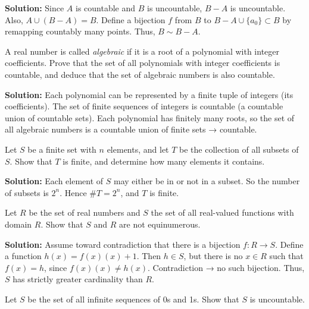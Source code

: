 \textbf{Solution:}  
Since \( A \) is countable and \( B \) is uncountable, \( B - A \) is uncountable.  
Also, \( A \cup (B - A) = B \). Define a bijection \( f \) from \( B \) to \( B - A \cup \{a_0\} \subset B \) by remapping countably many points.  
Thus, \( B \sim B - A \).

\begin{problembox}
A real number is called \emph{algebraic} if it is a root of a polynomial with integer coefficients.  
Prove that the set of all polynomials with integer coefficients is countable, and deduce that the set of algebraic numbers is also countable.
\end{problembox}

\textbf{Solution:}  
Each polynomial can be represented by a finite tuple of integers (its coefficients). The set of finite sequences of integers is countable (a countable union of countable sets).  
Each polynomial has finitely many roots, so the set of all algebraic numbers is a countable union of finite sets → countable.


\begin{problembox}
Let \( S \) be a finite set with \( n \) elements, and let \( T \) be the collection of all subsets of \( S \).  
Show that \( T \) is finite, and determine how many elements it contains.
\end{problembox}

\textbf{Solution:}  
Each element of \( S \) may either be in or not in a subset.  
So the number of subsets is \( 2^n \). Hence \( \#T = 2^n \), and \( T \) is finite.

\begin{problembox}
Let \( R \) be the set of real numbers and \( S \) the set of all real-valued functions with domain \( R \).  
Show that \( S \) and \( R \) are not equinumerous.
\end{problembox}

\textbf{Solution:}  
Assume toward contradiction that there is a bijection \( f: R \to S \).  
Define a function \( h(x) = f(x)(x) + 1 \). Then \( h \in S \), but there is no \( x \in R \) such that \( f(x) = h \), since \( f(x)(x) \ne h(x) \).  
Contradiction → no such bijection. Thus, \( S \) has strictly greater cardinality than \( R \).

\begin{problembox}
Let \( S \) be the set of all infinite sequences of 0s and 1s. Show that \( S \) is uncountable.
\end{problembox}

